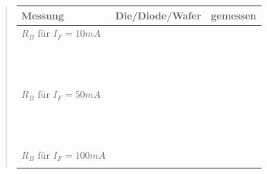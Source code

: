 \begin{quote}
      \begin{table}[h]
     \begin{addmargin}[-1cm]{3cm}
     \centering
                     \begin{tabular}{|p{3cm}|p{3cm}|p{10.2cm}|}
         \hline
         Messung & Die/Diode/Wafer & gemessen\\
         \hline
         $R_{B}$ für $I_{F}=10 mA$ & & \\
                                 & & \\
                                 & & \\
                                 & & \\
                                 & & \\
                                 & & \\
                                 & & \\
                                 & & \\
                                 & & \\
                                 & & \\
                                 & & \\
                                 & & \\
                                 & & \\
         \hline
         $R_{B}$ für $I_{F}=50 mA$ & & \\
                                 & & \\
                                 & & \\
                                 & & \\
                                 & & \\
                                 & & \\
                                 & & \\
                                 & & \\
                                 & & \\
                                 & & \\
                                 & & \\
                                 & & \\
                                 & & \\
         \hline
         $R_{B}$ für $I_{F}=100 mA$ & & \\
                                 & & \\

\end{tabular}
\end{addmargin}
\end{table}
\end{quote}
